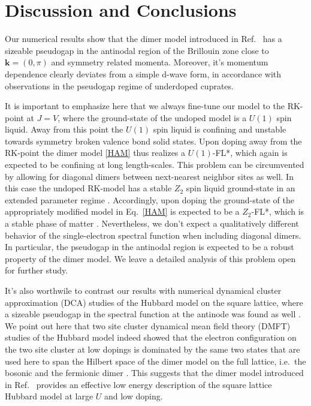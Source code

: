 \documentclass[aps,pra,reprint,showpacs,superscriptaddress]{revtex4-1}
\begin{document}
\section{Discussion and Conclusions}\label{M_S5}

Our numerical results show that the dimer model introduced in Ref.~\cite{punk2015quantum} has a sizeable pseudogap in the antinodal region of the Brillouin zone close to $\mathbf{k}=(0,\pi)$ and symmetry related momenta. Moreover, it's momentum dependence clearly deviates from a simple d-wave form, in accordance with observations in the pseudogap regime of underdoped cuprates. 

It is important to emphasize here that we always fine-tune our model to the RK-point at $J=V$, where the ground-state of the undoped model is a $U(1)$ spin liquid. Away from this point the $U(1)$ spin liquid is confining and unstable towards symmetry broken valence bond solid states. Upon doping away from the RK-point the dimer model \eqref{HAM} thus realizes a $U(1)$-FL*, which again is expected to be confining at long length-scales. This problem can be circumvented by allowing for diagonal dimers between next-nearest neighbor sites as well. In this case the undoped RK-model has a stable $Z_2$ spin liquid ground-state in an extended parameter regime \cite{moessner2001resonating}. Accordingly, upon doping the ground-state of the appropriately modified model in Eq.~\eqref{HAM} is expected to be a $Z_2$-FL*, which is a stable phase of matter \cite{Patel2016}. Nevertheless, we don't expect a qualitatively different behavior of the single-electron spectral function when including diagonal dimers. In particular, the pseudogap in the antinodal region is expected to be a robust property of the dimer model. We leave a detailed analysis of this problem open for further study.

It's also worthwile to contrast our results with numerical dynamical cluster approximation (DCA) studies of the Hubbard model on the square lattice, where a sizeable pseudogap in the spectral function at the antinode was found as well \cite{gull2010momentum,gull2013superconductivity}. We point out here that two site cluster dynamical mean field theory (DMFT) studies of the Hubbard model indeed showed that the electron configuration on the two site cluster at low dopings is dominated by the same two states that are used here to span the Hilbert space of the dimer model on the full lattice, i.e.~the bosonic and the fermionic dimer \cite{ferrero2009pseudogap}. This suggests that the dimer model introduced in Ref.~\cite{punk2015quantum} provides an effective low energy description of the square lattice Hubbard model at large $U$ and low doping.
\end{document}
